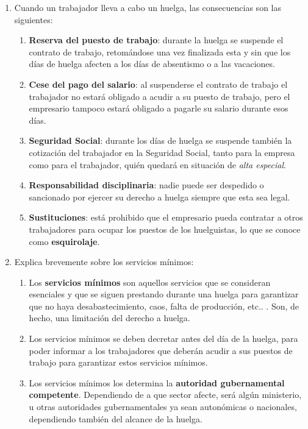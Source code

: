 \begin{enumerate}[label=(\alph*)]
    \item Cuando un trabajador lleva a cabo un huelga, las consecuencias son las siguientes:
    \begin{enumerate}
        \item \textbf{Reserva del puesto de trabajo}: durante la huelga se suspende el contrato de trabajo, retomándose una vez finalizada esta y sin que los días de huelga afecten a los días de absentismo o a las vacaciones.

        \item \textbf{Cese del pago del salario}: al suspenderse el contrato de trabajo el trabajador no estará obligado a acudir a su puesto de trabajo, pero el empresario tampoco estará obligado a pagarle su salario durante esos días.

        \item \textbf{Seguridad Social}: durante los días de huelga se suspende también la cotización del trabajador en la Seguridad Social, tanto para la empresa como para el trabajador, quién quedará en situación de \textit{alta especial}.

        \item \textbf{Responsabilidad disciplinaria}: nadie puede ser despedido o sancionado por ejercer su derecho a huelga siempre que esta sea legal.

        \item \textbf{Sustituciones}: está prohibido que el empresario pueda contratar a otros trabajadores para ocupar los puestos de los huelguistas, lo que se conoce como \textbf{esquirolaje}.
    \end{enumerate}
    \item Explica brevemente sobre los servicios mínimos:
    \begin{enumerate}
        \item Los \textbf{servicios mínimos} son aquellos servicios que se consideran esenciales y que se siguen prestando durante una huelga para garantizar que no haya desabastecimiento, caos, falta de producción, etc.. \cite{wiki01}. Son, de hecho, una limitación del derecho a huelga.

        \item Los servicios mínimos se deben decretar antes del día de la huelga, para poder informar a los trabajadores que deberán acudir a sus puestos de trabajo para garantizar estos servicios mínimos.

        \item Los servicios mínimos los determina la \textbf{autoridad gubernamental competente}. Dependiendo de a que sector afecte, será algún ministerio, u otras autoridades gubernamentales ya sean autonómicas o nacionales, dependiendo también del alcance de la huelga.


\end{enumerate}
\end{enumerate}
